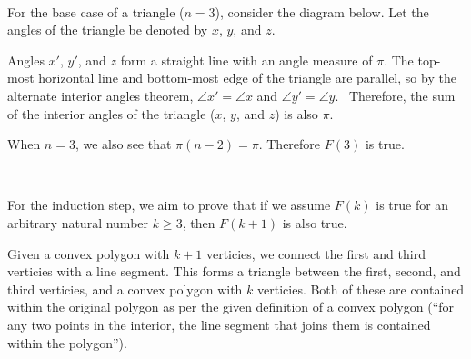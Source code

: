 \documentclass{article}
\begin{document}
\

For the base case of a triangle ($n=3$), consider the diagram below. Let the angles of the triangle be denoted by $x$, $y$, and $z$.
\begin{center}
\end{center}
Angles $x'$, $y'$, and $z$ form a straight line with an angle measure of $\pi $. The top-most horizontal line and bottom-most edge of the triangle are parallel, so by the alternate interior angles theorem, $\angle x'=\angle x$ and $\angle y'=\angle y$. \ Therefore, the sum of the interior angles of the triangle ($x$, $y$, and $z$) is also $\pi $.

When $n=3$, we also see that $\pi ( n-2) =\pi $. Therefore $F( 3)$ is true.

\

For the induction step, we aim to prove that if we assume $F( k)$ is true for an arbitrary natural number $k\geq 3$, then $F( k+1)$ is also true.

Given a convex polygon with $k+1$ verticies, we connect the first and third verticies with a line segment. This forms a triangle between the first, second, and third verticies, and a convex polygon with $k$ verticies. Both of these are contained within the original polygon as per the given definition of a convex polygon (``for any two points in the interior, the line segment that joins them is contained within the polygon'').
\end{document}
